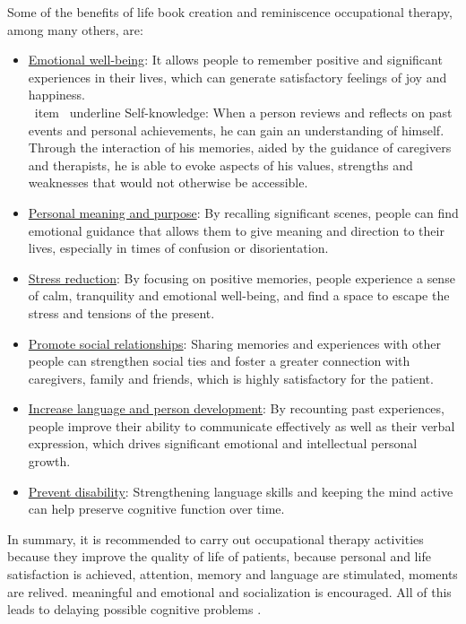 Some of the benefits of life book creation and reminiscence occupational therapy, among many others, are:\\
\begin{itemize}
	\item \underline{Emotional well-being}: It allows people to remember positive and significant experiences in their lives, which can generate satisfactory feelings of joy and happiness.\\
	\ item \ underline {Self-knowledge}: When a person reviews and reflects on past events and personal achievements, he can gain an understanding of himself. Through the interaction of his memories, aided by the guidance of caregivers and therapists, he is able to evoke aspects of his values, strengths and weaknesses that would not otherwise be accessible.
	\item \underline{Personal meaning and purpose}: By recalling significant scenes, people can find emotional guidance that allows them to give meaning and direction to their lives, especially in times of confusion or disorientation.
	\item \underline{Stress reduction}: By focusing on positive memories, people experience a sense of calm, tranquility and emotional well-being, and find a space to escape the stress and tensions of the present.
	\item \underline{Promote social relationships}: Sharing memories and experiences with other people can strengthen social ties and foster a greater connection with caregivers, family and friends, which is highly satisfactory for the patient.
	\item \underline{Increase language and person development}: By recounting past experiences, people improve their ability to communicate effectively as well as their verbal expression, which drives significant emotional and intellectual personal growth.
	\item \underline{Prevent disability}: Strengthening language skills and keeping the mind active can help preserve cognitive function over time. 
	\end{itemize}
	
	
	
	In summary, it is recommended to carry out occupational therapy activities because they improve the quality of life of patients, because personal and life satisfaction is achieved, attention, memory and language are stimulated, moments are relived. meaningful and emotional and socialization is encouraged. All of this leads to delaying possible cognitive problems \citep{SAS2020}.\\
	
